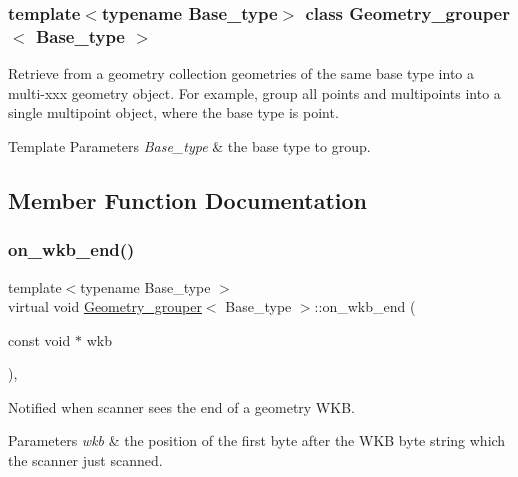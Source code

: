 \subsubsection*{template$<$typename Base\+\_\+type$>$\newline
class Geometry\+\_\+grouper$<$ Base\+\_\+type $>$}

Retrieve from a geometry collection geometries of the same base type into a multi-\/xxx geometry object. For example, group all points and multipoints into a single multipoint object, where the base type is point.


\begin{DoxyTemplParams}{Template Parameters}
{\em Base\+\_\+type} & the base type to group. \\
\hline
\end{DoxyTemplParams}


\subsection{Member Function Documentation}
\mbox{\label{classGeometry__grouper_a6e42cf59211e8d812ac6613e578cc8cf}} 
\subsubsection{\texorpdfstring{on\+\_\+wkb\+\_\+end()}{on\_wkb\_end()}}
{\footnotesize\ttfamily template$<$typename Base\+\_\+type $>$ \\
virtual void \mbox{\hyperlink{classGeometry__grouper}{Geometry\+\_\+grouper}}$<$ Base\+\_\+type $>$\+::on\+\_\+wkb\+\_\+end (\begin{DoxyParamCaption}\item[{const void $\ast$}]{wkb }\end{DoxyParamCaption})\hspace{0.3cm}{\ttfamily [inline]}, {\ttfamily [virtual]}}

Notified when scanner sees the end of a geometry W\+KB. 
\begin{DoxyParams}{Parameters}
{\em wkb} & the position of the first byte after the W\+KB byte string which the scanner just scanned. \\
\hline
\end{DoxyParams}


